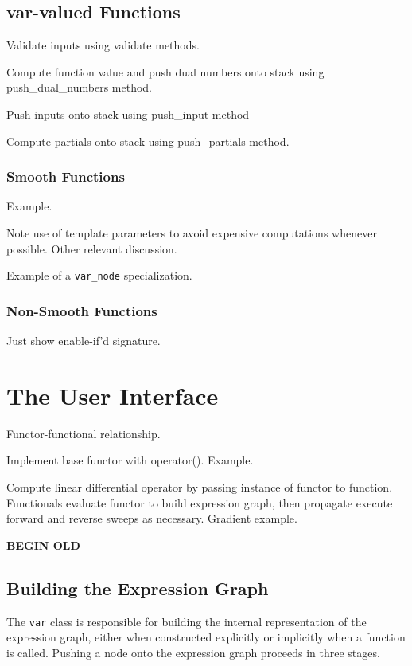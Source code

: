 \subsection{var-valued Functions}

Validate inputs using validate methods.

Compute function value and push dual numbers onto stack
using push\_dual\_numbers method.

Push inputs onto stack using push\_input method

Compute partials onto stack using push\_partials method.

\subsubsection{Smooth Functions}

Example.

Note use of template parameters to avoid expensive computations
whenever possible.  Other relevant discussion.

Example of a \verb|var_node| specialization.

\subsubsection{Non-Smooth Functions}

Just show enable-if'd signature.

\section{The \nomad User Interface}

Functor-functional relationship.

Implement base functor with operator().  Example.

Compute linear differential operator by
passing instance of functor to function.  Functionals
evaluate functor to build expression graph, then
propagate execute forward and reverse sweeps
as necessary.  Gradient example.

\textbf{BEGIN OLD}

\subsection{Building the Expression Graph}

The \verb|var| class is responsible for building the internal representation
of the expression graph, either when constructed explicitly or implicitly
when a function is called.  Pushing a node onto the expression graph 
proceeds in three stages.

